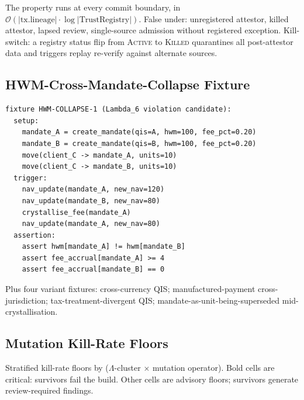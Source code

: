 \documentclass[11pt,a4paper]{article}
\begin{document}
The property runs at every commit boundary, in $\mathcal{O}(|\text{tx.lineage}| \cdot \log |\text{TrustRegistry}|)$. False under: unregistered attestor, killed attestor, lapsed review, single-source admission without registered exception. Kill-switch: a registry status flip from \textsc{Active} to \textsc{Killed} quarantines all post-attestor data and triggers replay re-verify against alternate sources.

\subsection{HWM-Cross-Mandate-Collapse Fixture}
\label{sec:pbt-hwm}

\begin{lstlisting}
fixture HWM-COLLAPSE-1 (Lambda_6 violation candidate):
  setup:
    mandate_A = create_mandate(qis=A, hwm=100, fee_pct=0.20)
    mandate_B = create_mandate(qis=B, hwm=100, fee_pct=0.20)
    move(client_C -> mandate_A, units=10)
    move(client_C -> mandate_B, units=10)
  trigger:
    nav_update(mandate_A, new_nav=120)
    nav_update(mandate_B, new_nav=80)
    crystallise_fee(mandate_A)
    nav_update(mandate_A, new_nav=80)
  assertion:
    assert hwm[mandate_A] != hwm[mandate_B]
    assert fee_accrual[mandate_A] >= 4
    assert fee_accrual[mandate_B] == 0
\end{lstlisting}

Plus four variant fixtures: cross-currency QIS; manufactured-payment cross-jurisdiction; tax-treatment-divergent QIS; mandate-as-unit-being-superseded mid-crystallisation.

\subsection{Mutation Kill-Rate Floors}
\label{sec:pbt-mutation}

Stratified kill-rate floors by ($\Lambda$-cluster $\times$ mutation operator). Bold cells are critical: survivors fail the build. Other cells are advisory floors; survivors generate review-required findings.
\end{document}
